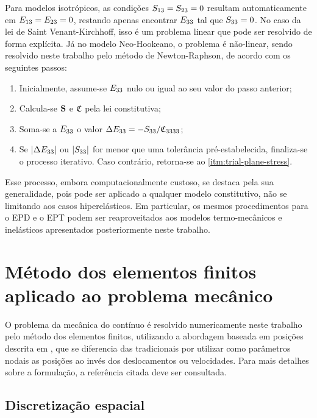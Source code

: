 \documentclass[Tese.tex]{subfiles}
\begin{document}
Para modelos isotrópicos, as condições $\Sind_{13}=\Sind_{23}=0$ resultam automaticamente em $\Eind_{13}=\Eind_{23}=0$, restando apenas encontrar $\Eind_{33}$ tal que $\Sind_{33}=0$. No caso da lei de Saint Venant-Kirchhoff, isso é um problema linear que pode ser resolvido de forma explícita. Já no modelo Neo-Hookeano, o problema é não-linear, sendo resolvido neste trabalho pelo método de Newton-Raphson, de acordo com os seguintes passos:
\begin{enumerate}[leftmargin=\parindent,labelwidth=\parindent,labelsep=0.3cm,noitemsep]
	\item Inicialmente, assume-se $\Eind_{33}$ nulo ou igual ao seu valor do passo anterior;
	\item Calcula-se $\S$ e $\CCind$ pela lei constitutiva; \label{itm:trial-plane-stress}
	\item Soma-se a $\Eind_{33}$ o valor $\Delta\Eind_{33}=-\Sind_{33}/\CCind_{3333}$;
	\item Se $|\Delta\Eind_{33}|$ ou $|\Sind_{33}|$ for menor que uma tolerância pré-estabelecida, finaliza-se o processo iterativo. Caso contrário, retorna-se ao \autoref{itm:trial-plane-stress}.
\end{enumerate}

Esse processo, embora computacionalmente custoso, se destaca pela sua generalidade, pois pode ser aplicado a qualquer modelo constitutivo, não se limitando aos casos hiperelásticos. Em particular, os mesmos procedimentos para o EPD e o EPT podem ser reaproveitados aos modelos termo-mecânicos e inelásticos apresentados posteriormente neste trabalho.

\section{Método dos elementos finitos aplicado ao problema mecânico}\label{sec:mef}

O problema da mecânica do contínuo é resolvido numericamente neste trabalho pelo método dos elementos finitos, utilizando a abordagem baseada em posições descrita em , que se diferencia das tradicionais por utilizar como parâmetros nodais as posições ao invés dos deslocamentos ou velocidades. Para mais detalhes sobre a formulação, a referência citada deve ser consultada.

\subsection{Discretização espacial}
\end{document}
